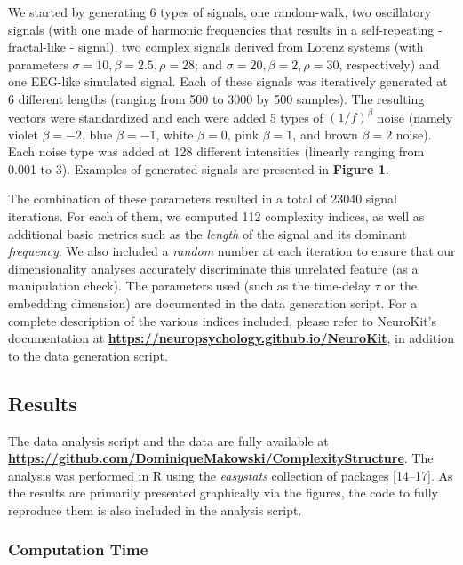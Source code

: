 \documentclass[
  man]{apa6}
\begin{document}
We started by generating 6 types of signals, one random-walk, two oscillatory signals (with one made of harmonic frequencies that results in a self-repeating - fractal-like - signal), two complex signals derived from Lorenz systems (with parameters \(\sigma = 10, \beta = 2.5, \rho = 28\); and \(\sigma = 20, \beta = 2, \rho = 30\), respectively) and one EEG-like simulated signal. Each of these signals was iteratively generated at 6 different lengths (ranging from 500 to 3000 by 500 samples). The resulting vectors were standardized and each were added 5 types of \((1/f)^\beta\) noise (namely violet \(\beta=-2\), blue \(\beta=-1\), white \(\beta=0\), pink \(\beta=1\), and brown \(\beta=2\) noise). Each noise type was added at 128 different intensities (linearly ranging from 0.001 to 3). Examples of generated signals are presented in \textbf{Figure 1}.

The combination of these parameters resulted in a total of 23040 signal iterations. For each of them, we computed 112 complexity indices, as well as additional basic metrics such as the \emph{length} of the signal and its dominant \emph{frequency}. We also included a \emph{random} number at each iteration to ensure that our dimensionality analyses accurately discriminate this unrelated feature (as a manipulation check). The parameters used (such as the time-delay \(\tau\) or the embedding dimension) are documented in the data generation script. For a complete description of the various indices included, please refer to NeuroKit's documentation at \textbf{\url{https://neuropsychology.github.io/NeuroKit}}, in addition to the data generation script.

\hypertarget{results}{%
\subsection{Results}\label{results}}

The data analysis script and the data are fully available at \textbf{\url{https://github.com/DominiqueMakowski/ComplexityStructure}}. The analysis was performed in R using the \emph{easystats} collection of packages {[}14--17{]}. As the results are primarily presented graphically via the figures, the code to fully reproduce them is also included in the analysis script.

\hypertarget{computation-time}{%
\subsubsection{Computation Time}\label{computation-time}}
\end{document}
